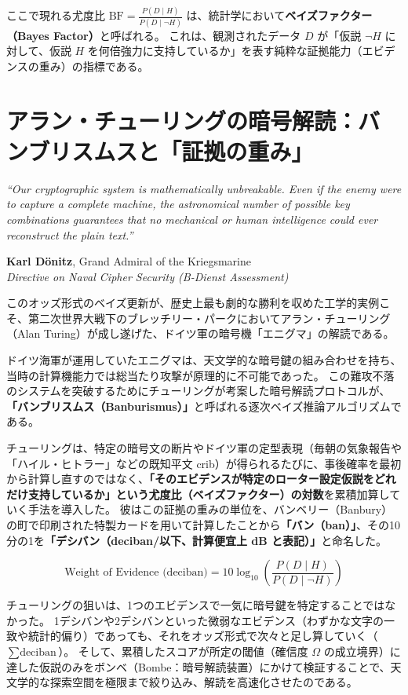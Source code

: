 ここで現れる尤度比 $\mathrm{BF} = \frac{P(D \mid H)}{P(D \mid \neg H)}$ は、統計学において\textbf{ベイズファクター（Bayes Factor）}と呼ばれる。
これは、観測されたデータ $D$ が「仮説 $\neg H$ に対して、仮説 $H$ を何倍強力に支持しているか」を表す純粋な証拠能力（エビデンスの重み）の指標である。

\section{アラン・チューリングの暗号解読：バンブリスムスと「証拠の重み」}
\epigraph{%
  \itshape ``Our cryptographic system is mathematically unbreakable.
  Even if the enemy were to capture a complete machine,
  the astronomical number of possible key combinations guarantees
  that no mechanical or human intelligence could ever reconstruct the plain text.''
}{%
  \textbf{Karl Dönitz}, Grand Admiral of the Kriegsmarine\\
  \textit{Directive on Naval Cipher Security (B-Dienst Assessment)}
}
このオッズ形式のベイズ更新が、歴史上最も劇的な勝利を収めた工学的実例こそ、第二次世界大戦下のブレッチリー・パークにおいてアラン・チューリング（Alan Turing）が成し遂げた、ドイツ軍の暗号機「エニグマ」の解読である。

ドイツ海軍が運用していたエニグマは、天文学的な暗号鍵の組み合わせを持ち、当時の計算機能力では総当たり攻撃が原理的に不可能であった。
この難攻不落のシステムを突破するためにチューリングが考案した暗号解読プロトコルが、\textbf{「バンブリスムス（Banburismus）」}と呼ばれる逐次ベイズ推論アルゴリズムである。

チューリングは、特定の暗号文の断片やドイツ軍の定型表現（毎朝の気象報告や「ハイル・ヒトラー」などの既知平文 crib）が得られるたびに、事後確率を最初から計算し直すのではなく、\textbf{「そのエビデンスが特定のローター設定仮説をどれだけ支持しているか」という尤度比（ベイズファクター）の対数}を累積加算していく手法を導入した。
彼はこの証拠の重みの単位を、バンベリー（Banbury）の町で印刷された特製カードを用いて計算したことから\textbf{「バン（ban）」}、その10分の1を\textbf{「デシバン（deciban/以下、計算便宜上 dB と表記）」}と命名した。

\begin{equation}
\text{Weight of Evidence (deciban)} = 10 \log_{10} \left( \frac{P(D \mid H)}{P(D \mid \neg H)} \right)
\end{equation}

チューリングの狙いは、1つのエビデンスで一気に暗号鍵を特定することではなかった。
1デシバンや2デシバンといった微弱なエビデンス（わずかな文字の一致や統計的偏り）であっても、それをオッズ形式で次々と足し算していく（$\sum \text{deciban}$）。
そして、累積したスコアが所定の閾値（確信度 $\Omega$ の成立境界）に達した仮説のみをボンベ（Bombe：暗号解読装置）にかけて検証することで、天文学的な探索空間を極限まで絞り込み、解読を高速化させたのである。

